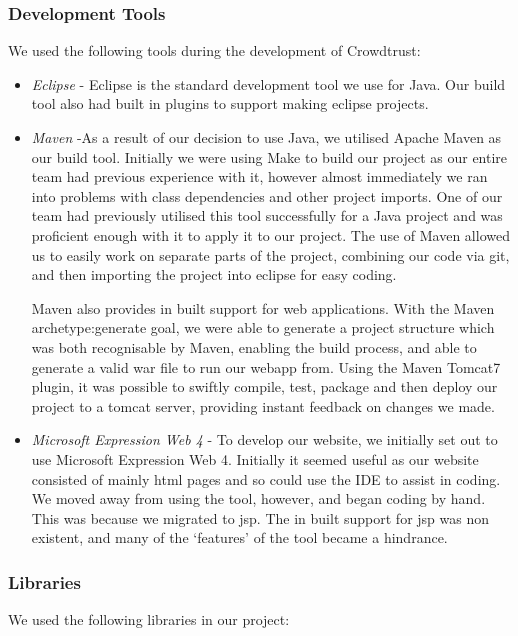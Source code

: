 \documentclass[11pt]{article}
\begin{document}
\subsubsection{Development Tools}
We used the following tools during the development of Crowdtrust:
\begin{itemize}
\item
\emph{Eclipse} - 
Eclipse is the standard development tool we use for Java. Our build tool also
had built in plugins to support making eclipse projects.
\item
\emph{Maven} -As a result of our decision to use Java, we utilised Apache Maven as
our build tool. Initially we were using Make to build our project as our entire team had 
previous experience with it, however almost immediately we ran into problems with
class dependencies and other project imports. One of our team had previously utilised
this tool successfully for a Java project and was proficient enough with it to apply
it to our project. The use of Maven allowed us to easily work on separate parts of
the project, combining our code via git, and then importing the project into eclipse
for easy coding.

Maven also provides in built support for web applications. With the Maven archetype:generate
goal, we were able to generate a project structure which was both recognisable by
Maven, enabling the build process, and able to generate a valid war file to run our webapp
from. Using the Maven Tomcat7 plugin, it was possible to swiftly compile, test, package and
then deploy our project to a tomcat server, providing instant feedback on changes we made. 

\item
\emph{Microsoft Expression Web 4} - 
To develop our website, we initially set out to use Microsoft Expression Web 4.
Initially it seemed useful as our website consisted of mainly html pages and so
could use the IDE to assist in coding. We moved away from using the tool, however, and began coding by hand. This was because we migrated to jsp. The in built support for jsp was non existent, and many of the `features' of the tool became a hindrance.
\end{itemize}
\subsubsection{Libraries}
We used the following libraries in our project:
\end{document}
